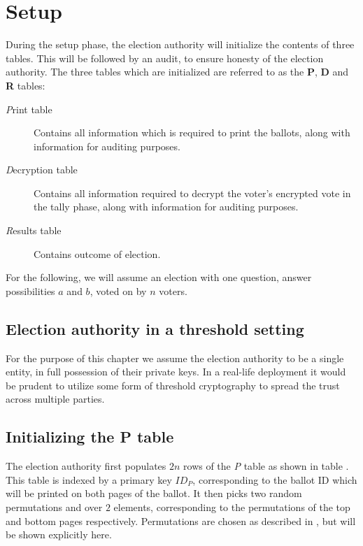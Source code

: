 \chapter{Setup}

During the setup phase, the election authority will initialize the contents of
three tables. This will be followed by an audit, to ensure honesty of the
election authority. The three tables which are initialized are referred to as
the \textbf{P}, \textbf{D} and \textbf{R} tables:
\begin{description}
\item[\emph{P}rint table] Contains all information which is required to print
the ballots, along with information for auditing purposes.
\item[\emph{D}ecryption table] Contains all information required to decrypt the
voter's encrypted vote in the tally phase, along with information for auditing
purposes.
\item[\emph{R}esults table] Contains outcome of election.
\end{description}

For the following, we will assume an election with one question, answer
possibilities $a$ and $b$, voted on by $n$ voters.

\section{Election authority in a threshold setting}

For the purpose of this chapter we assume the election authority to be a single entity, in full possession of their private keys. In a real-life deployment it would be prudent to utilize some form of threshold cryptography to spread the trust across multiple parties.

\section{Initializing the \textbf{P} table}

The election authority first populates $2n$ rows of the \emph{P} table as shown
in table . This table is indexed by a primary key $ID_P$,
corresponding to the ballot ID which will be printed on both pages of the
ballot. It then picks two random permutations \ptop{} and \pbottom{}
over $2$ elements, corresponding to the permutations of the top and bottom
pages respectively. Permutations are chosen as described in %
, but will be shown explicitly here.

